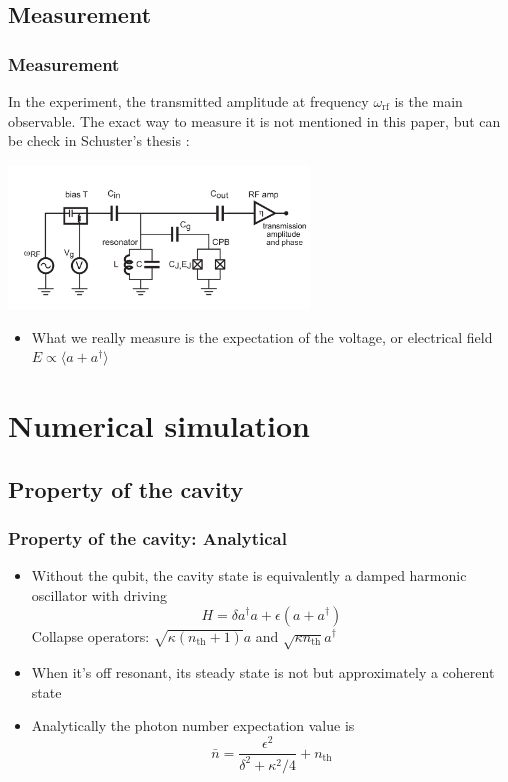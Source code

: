\documentclass[xcolor=dvipsnames,hyperref={CJKbookmarks=true}]{beamer}
\newcommand{\rf}{\text{rf}}
\newcommand{\thm}{\text{th}}
\begin{document}
\subsection{Measurement}
\begin{frame}[t]\frametitle{Measurement}
In the experiment, the transmitted amplitude at frequency $\omega_{\rf}$ is the main observable. The exact way to measure it is not mentioned in this paper, 
but can be check in Schuster's thesis \cite{schuster2007circuit}: 
\begin{center}
  \includegraphics[width=0.6\textwidth]{measurement.png}
\end{center}
	\begin{itemize}
		\item What we really measure is the expectation of the voltage, or 
		electrical field $E\propto\langle a + a^\dag \rangle$
	\end{itemize}

\end{frame}

\section{Numerical simulation}
\subsection{Property of the cavity}
\begin{frame}[t]\frametitle{Property of the cavity: Analytical}
\begin{itemize}
	\item Without the qubit, the cavity state is equivalently a damped harmonic oscillator with driving
	$$
	 H = \delta a^\dag a + \epsilon (a + a^\dag)
	$$
	Collapse operators: $\sqrt{\kappa(n_{\thm}+1)}a$ and 
	$\sqrt{\kappa n_{\thm}}a^\dag$
	\item When it's off resonant, its steady state is not but approximately a coherent state
	\item Analytically the photon number expectation value is 
	$$
	\bar n = \frac{\epsilon^2}{\delta^2 + \kappa^2/4} + n_{\thm}
	$$
\end{itemize}
\end{frame}
\end{document}

